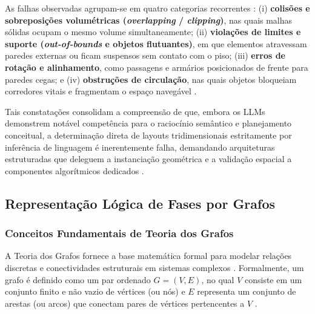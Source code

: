 As falhas observadas agrupam-se em quatro categorias recorrentes \cite{sun2024roomplanner, xu2025constraint, feng2026repurposing3dgenerativemodel, yang2026codeasroomgenerating3drooms}: (i) \textbf{colisões e sobreposições volumétricas (\textit{overlapping} / \textit{clipping})}, nas quais malhas sólidas ocupam o mesmo volume simultaneamente; (ii) \textbf{violações de limites e suporte (\textit{out-of-bounds} e objetos flutuantes)}, em que elementos atravessam paredes externas ou ficam suspensos sem contato com o piso; (iii) \textbf{erros de rotação e alinhamento}, como passagens e armários posicionados de frente para paredes cegas; e (iv) \textbf{obstruções de circulação}, nas quais objetos bloqueiam corredores vitais e fragmentam o espaço navegável \cite{sun2024roomplanner, xu2025constraint, xu2025databasedrivenframework3dlevel}.

Tais constatações consolidam a compreensão de que, embora os LLMs demonstrem notável competência para o raciocínio semântico e planejamento conceitual, a determinação direta de layouts tridimensionais estritamente por inferência de linguagem é inerentemente falha, demandando arquiteturas estruturadas que deleguem a instanciação geométrica e a validação espacial a componentes algorítmicos dedicados \cite{hu2024scenecraft, sun2024roomplanner, xu2025constraint, xu2025databasedrivenframework3dlevel, yang2026codeasroomgenerating3drooms}.

\subsection{Representação Lógica de Fases por Grafos}
\label{sec:grafos}

\subsubsection{Conceitos Fundamentais de Teoria dos Grafos}
\label{sec:conceitos_grafos}

A Teoria dos Grafos fornece a base matemática formal para modelar relações discretas e conectividades estruturais em sistemas complexos \cite{cormen2009introduction}. Formalmente, um grafo é definido como um par ordenado $G = (V, E)$, no qual $V$ consiste em um conjunto finito e não vazio de vértices (ou nós) e $E$ representa um conjunto de arestas (ou arcos) que conectam pares de vértices pertencentes a $V$ \cite{cormen2009introduction}.

